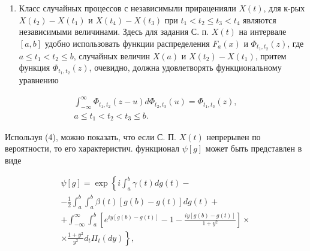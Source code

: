 \documentclass[10pt]{article}
\begin{document}
\begin{enumerate}

  \item Класс случайных процессов с независимыли прираценияли $X(t)$, для к-рых $X\left(t_{2}\right)-X\left(t_{1}\right)$ и $X\left(t_{4}\right)-X\left(t_{3}\right)$ при $t_{1}<t_{2} \leqslant t_{3}<t_{4}$ являются независимыми величинами. Здесь для задания С. п. $X(t)$ на интервале $[a, b]$ удобно использовать функции распределения $F_{a}(x)$ и $\Phi_{t_{1}, t_{2}}(z)$, где $a \leqslant t_{1}<t_{2} \leqslant b$, случайных величин $X(a)$ и $X\left(t_{2}\right)-X\left(t_{1}\right)$, притем функция $\Phi_{t_{1}, t_{2}}(z)$, очевидно, должна удовлетворять функциональному уравнению

\end{enumerate}



\[

\begin{gathered}

\int_{-\infty}^{\infty} \Phi_{t_{1}, t_{2}}(z-u) d \Phi_{t_{2}, t_{3}}(u)=\Phi_{t_{1}, t_{3}}(z), \\

a \leqslant t_{1}<t_{2}<t_{3} \leqslant b .

\end{gathered}

\]



Используя (4), можно показать, что если С. П. $X(t)$ непрерывен по вероятности, то его характеристич. функционал $\psi[g]$ может быть представлен в виде



\[

\begin{gathered}

\psi[g]=\exp \left\{i \int_{a}^{b} \gamma(t) d g(t)-\right. \\

-\frac{1}{2} \int_{a}^{b} \int_{a}^{b} \beta(t)[g(b)-g(t)] d g(t)+ \\

+\int_{-\infty}^{\infty} \int_{a}^{b}\left[e^{i y[g(b)-g(t)]}-1-\frac{i y[g(b)-g(t)]}{1+y^{2}}\right] \times \\

\left.\times \frac{1+y^{2}}{y^{2}} d_{t} \Pi_{t}(d y)\right\},

\end{gathered}

\]
\end{document}
